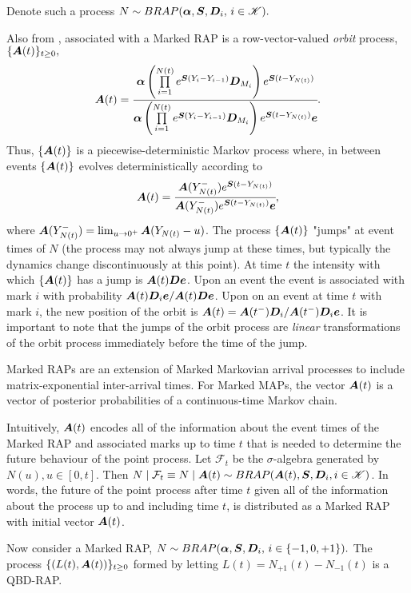 Denote such a process \(N\sim BRAP(\boldsymbol \alpha, \boldsymbol S, \boldsymbol D_i,\,i\in\mathscr K).\)

Also from \cite{bn2010}, associated with a Marked RAP is a row-vector-valued \emph{orbit} process, \(\{\boldsymbol A(t)\}_{t\geq0},\)
\[\boldsymbol A(t) = \cfrac{\boldsymbol \alpha\left( \prod\limits_{i=1}^{N(t)} e^{\boldsymbol S(Y_{i}-Y_{i-1})}\boldsymbol D_{M_i}\right)e^{\boldsymbol S (t-Y_{N(t)})}}{\boldsymbol \alpha\left( \prod\limits_{i=1}^{N(t)} e^{\boldsymbol S(Y_{i}-Y_{i-1})}\boldsymbol D_{M_i}\right)e^{\boldsymbol S( t-Y_{N(t)})}\boldsymbol e}.\]
Thus, \(\{\boldsymbol A(t)\}\) is a piecewise-deterministic Markov process where, in between events \(\{\boldsymbol A(t)\}\) evolves deterministically according to 
\[\boldsymbol A(t) = \cfrac{\boldsymbol A(Y_{N(t)}^-)e^{\boldsymbol S(t-Y_{N(t)})}}{\boldsymbol A(Y_{N(t)}^-)e^{\boldsymbol S(t-Y_{N(t)})}\boldsymbol e},\]
where \(\boldsymbol A(Y_{N(t)}^-) = \lim_{u\to 0^+}\boldsymbol A(Y_{N(t)}-u)\). The process \(\{\boldsymbol A(t)\}\) "jumps" at event times of \(N\) (the process may not always jump at these times, but typically the dynamics change discontinuously at this point). At time \(t\) the intensity with which \(\{\boldsymbol A(t)\}\) has a jump is \(\boldsymbol A(t) \boldsymbol D\boldsymbol e\). Upon an event the event is associated with mark \(i\) with probability \(\boldsymbol A(t) \boldsymbol D_i\boldsymbol e/\boldsymbol A(t) \boldsymbol D\boldsymbol e\). Upon on an event at time \(t\) with mark \(i\), the new position of the orbit is \(\boldsymbol A(t) = \boldsymbol A(t^-) \boldsymbol D_i/\boldsymbol A(t^-) \boldsymbol D_i\boldsymbol e\). It is important to note that the jumps of the orbit process are \emph{linear} transformations of the orbit process immediately before the time of the jump. 

Marked RAPs are an extension of Marked Markovian arrival processes to include matrix-exponential inter-arrival times. For Marked MAPs, the vector \(\boldsymbol A(t)\) is a vector of posterior probabilities of a continuous-time Markov chain. 

Intuitively, \(\boldsymbol A(t)\) encodes all of the information about the event times of the Marked RAP and associated marks up to time \(t\) that is needed to determine the future behaviour of the point process. Let \(\mathcal F_{t}\) be the \(\sigma\)-algebra generated by \(N(u), u\in[0,t]\). Then \(N\mid \mathcal F_t \equiv N\mid \boldsymbol A(t) \sim BRAP(\boldsymbol A(t), \boldsymbol S, \boldsymbol D_i,i\in\mathscr K)\). In words, the future of the point process after time \(t\) given all of the information about the process up to and including time \(t\), is distributed as a Marked RAP with initial vector \(\boldsymbol A(t)\). 

Now consider a Marked RAP, \(N\sim BRAP(\boldsymbol \alpha, \boldsymbol S, \boldsymbol D_i,\,i\in\{-1,0,+1\}).\) The process \(\{(L(t),\boldsymbol A(t))\}_{t\geq0}\) formed by letting \(L(t) = N_{+1}(t) - N_{-1}(t)\) is a QBD-RAP. 

